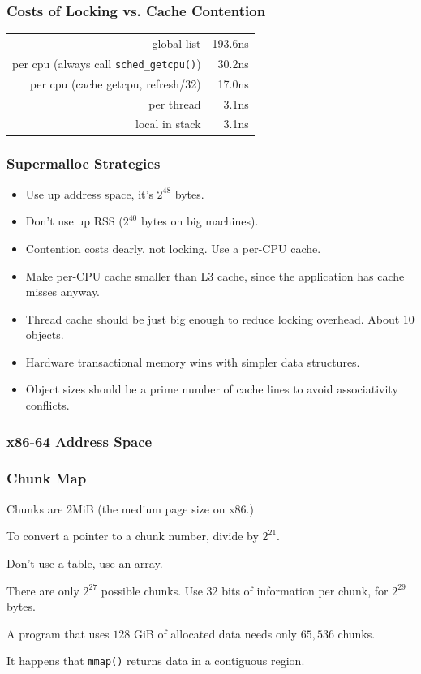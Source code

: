 \documentclass[xcolor=dvipsnames,14pt]{beamer}
\begin{document}
\begin{frame}
\frametitle{Costs of Locking vs. Cache Contention}

\begin{tabular}{rr}
                                                     global list &    193.6ns \\
            per cpu (always call \texttt{sched_getcpu()})  &     30.2ns \\
per cpu (cache getcpu, refresh/32) &     17.0ns \\
                                                      per thread &      3.1ns \\
                                                  local in stack &      3.1ns \\
\end{tabular}
\end{frame}

\begin{frame}
\frametitle{Supermalloc Strategies}

\begin{itemize}
\item Use up address space, it's $2^{48}$ bytes.
\item Don't use up RSS ($2^{40}$ bytes on big machines).
\item Contention costs dearly, not locking.  Use a per-CPU cache.
\item Make per-CPU cache smaller than L3 cache, since the application
  has cache misses anyway.
\item Thread cache should be just big enough to reduce locking overhead.  About 10 objects.
\item Hardware transactional memory wins with simpler data structures.
\item Object sizes should be a prime number of cache lines to avoid associativity conflicts.
\end{itemize}
\end{frame}

\begin{frame}
\frametitle{x86-64 Address Space}


\end{frame}

\begin{frame}
\frametitle{Chunk Map}

Chunks are 2MiB (the medium page size on x86.)

To convert a pointer to a chunk number, divide by $2^{21}$.

Don't use a table, use an array.

There are only $2^{27}$ possible chunks.  Use 32 bits of information
per chunk, for $2^{29}$ bytes.

A program that uses $128$ GiB of allocated data needs only $65,536$
chunks.

It happens that \texttt{mmap()} returns data in a contiguous region.

\end{frame}
\end{document}
